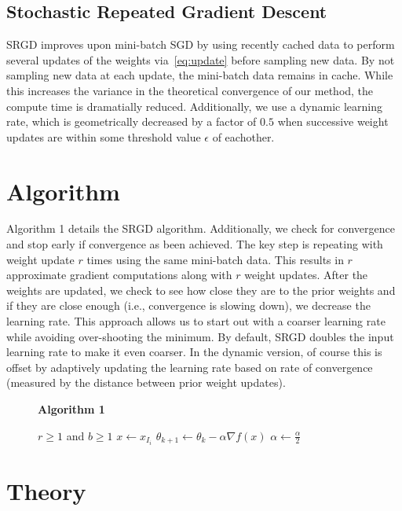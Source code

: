 \documentclass[conference,compsoc]{IEEEtran}
\begin{document}
\subsection{Stochastic Repeated Gradient Descent}
SRGD improves upon mini-batch SGD by using recently cached data to perform
several updates of the weights via~\ref{eq:update} before sampling new data. By
not sampling new data at each update, the mini-batch data remains in cache.
While this increases the variance in the theoretical convergence of our method,
the compute time is dramatially reduced. Additionally, we use a dynamic learning
rate, which is geometrically decreased by a factor of $0.5$ when successive
weight updates are within some threshold value $\epsilon$ of eachother.

\section{Algorithm}
Algorithm 1 details the SRGD algorithm. Additionally, we check for convergence
and stop early if convergence as been achieved. The key step is repeating with
weight update $r$ times using the same mini-batch data. This results in $r$
approximate gradient computations along with $r$ weight updates. After the
weights are updated, we check to see how close they are to the prior weights and
if they are close enough (i.e., convergence is slowing down), we decrease the
learning rate. This approach allows us to start out with a coarser learning rate
while avoiding over-shooting the minimum. By default, SRGD doubles the input
learning rate to make it even coarser. In the dynamic version, of
course this is offset by adaptively updating the learning rate based on
rate of convergence (measured by the distance between prior weight updates).

\begin{figure}
    \textbf{Algorithm 1}
    \label{fig:algorithm}
    \begin{algorithmic}[1]
    \REQUIRE $r \geq 1$ and $b \geq 1$ 
        \STATE $x \gets x_{I_i}$
            \STATE $\theta_{k+1} \gets \theta_k - \alpha \nabla f(x)$
        \ENDFOR
            \STATE $\alpha \gets \frac{\alpha}{2}$
        \ENDIF
    \ENDFOR
    \end{algorithmic}
\end{figure}
\section{Theory}
\end{document}
